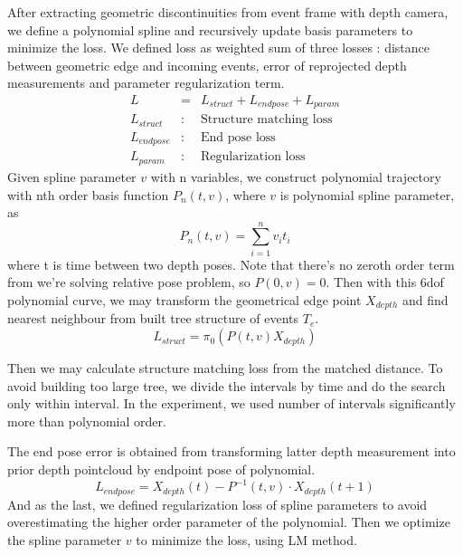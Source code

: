 After extracting geometric discontinuities from event frame with depth camera,
we define a polynomial spline and recursively update basis parameters to minimize
the loss. We defined loss as weighted sum of three losses : distance between
geometric edge and incoming events, error of reprojected depth measurements and
parameter regularization term.
\begin{eqnarray}
\label{eq:loss}
L &=& L_{struct} + L_{endpose} + L_{param}\\
L_{struct} &:& \text{Structure matching loss}\nonumber\\
L_{endpose} &:& \text{End pose loss}\nonumber\\
L_{param} &:& \text{Regularization loss}\nonumber
\end{eqnarray}
Given spline parameter $v$ with n variables, we construct polynomial trajectory
with nth order basis function $P_n(t,v)$, where $v$ is polynomial spline parameter, as
\begin{equation}
P_n(t,v) = \sum_{i=1}^{n} v_i t_i \nonumber
\end{equation}
where t is time between two depth poses. Note that there's no zeroth order term
from we're solving relative pose problem, so $P(0,v)=0$. Then with this 6dof
polynomial curve, we may transform the geometrical edge point $X_{depth}$ and find nearest
neighbour from built tree structure of events $T_e$.
\begin{equation}
L_{struct} = \pi_0(P(t,v) X_{depth})\nonumber
\end{equation}

Then we may calculate
structure matching loss from the matched distance. To avoid building too large
tree, we divide the intervals by time and do the search only within interval.
In the experiment, we used number of intervals significantly more than polynomial order.

The end pose error is obtained from transforming latter depth measurement into
prior depth pointcloud by endpoint pose of polynomial.
\begin{equation}
L_{endpose} = X_{depth}(t) - P^{-1}(t,v)\cdot X_{depth}(t+1)\nonumber
\end{equation}
And as the last, we defined
regularization loss of spline parameters to avoid overestimating the higher order
parameter of the polynomial. Then we optimize the spline parameter $v$ to minimize
the loss, using LM method.